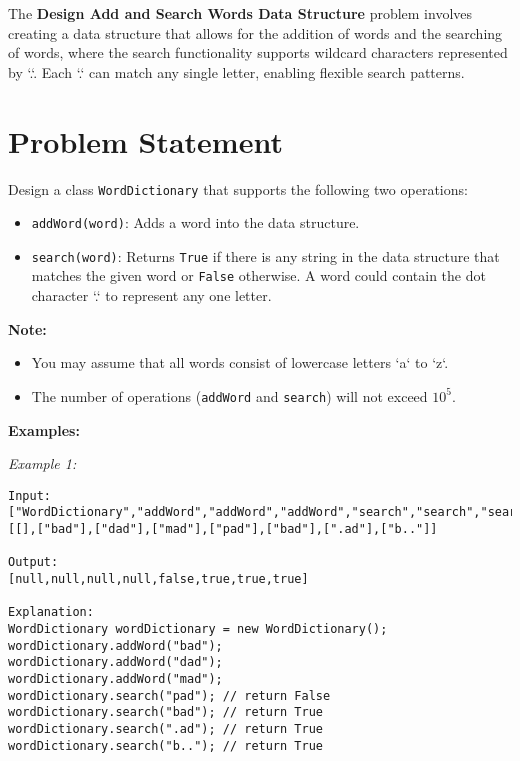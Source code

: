 
\label{problem:design_add_search_words_data_structure}

The \textbf{Design Add and Search Words Data Structure} problem involves creating a data structure that allows for the addition of words and the searching of words, where the search functionality supports wildcard characters represented by `.`. Each `.` can match any single letter, enabling flexible search patterns.

\section*{Problem Statement}

Design a class \texttt{WordDictionary} that supports the following two operations:

\begin{itemize}
    \item \texttt{addWord(word)}: Adds a word into the data structure.
    \item \texttt{search(word)}: Returns \texttt{True} if there is any string in the data structure that matches the given word or \texttt{False} otherwise. A word could contain the dot character `.` to represent any one letter.
\end{itemize}

\textbf{Note:}
\begin{itemize}
    \item You may assume that all words consist of lowercase letters `a` to `z`.
    \item The number of operations (\texttt{addWord} and \texttt{search}) will not exceed \(10^5\).
\end{itemize}

\textbf{Examples:}

\textit{Example 1:}

\begin{verbatim}
Input:
["WordDictionary","addWord","addWord","addWord","search","search","search","search"]
[[],["bad"],["dad"],["mad"],["pad"],["bad"],[".ad"],["b.."]]

Output:
[null,null,null,null,false,true,true,true]

Explanation:
WordDictionary wordDictionary = new WordDictionary();
wordDictionary.addWord("bad");
wordDictionary.addWord("dad");
wordDictionary.addWord("mad");
wordDictionary.search("pad"); // return False
wordDictionary.search("bad"); // return True
wordDictionary.search(".ad"); // return True
wordDictionary.search("b.."); // return True
\end{verbatim}

